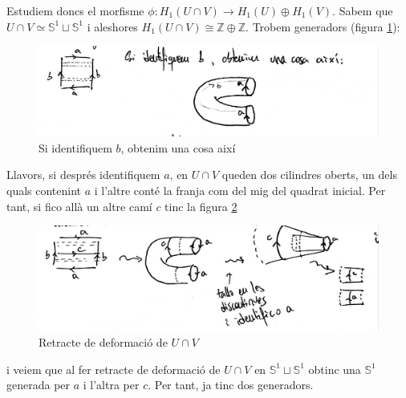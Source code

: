 \documentclass[../main.tex]{subfiles}
\begin{document}
\begin{sol}
Estudiem doncs el morfisme $\phi:H_1(U\cap V)\longrightarrow H_1(U)\oplus H_1(V)$. Sabem que $U\cap V\simeq \mathbb{S}^1\sqcup\mathbb{S}^1$ i aleshores $H_1(U\cap V)\cong\mathbb{Z}\oplus \mathbb{Z}$. Trobem generadors (figura \ref{fig:kleinmv1}):
\begin{figure}[H]
    \centering
    \includegraphics[scale = 0.25]{pictures/kleinmv1.jpeg}
    \caption{Si identifiquem $b$, obtenim una cosa així}
    \label{fig:kleinmv1}
\end{figure}
Llavors, si després identifiquem $a$, en $U\cap V$ queden dos cilindres oberts, un dels quals contenint $a$ i l'altre conté la franja com del mig del quadrat inicial. Per tant, si fico allà un altre camí $c$ tinc la figura \ref{fig:kleinmv2}
\begin{figure}[H]
    \centering
    \includegraphics[scale = 0.25]{pictures/kleinmv2.jpeg}
    \caption{Retracte de deformació de $U\cap V$}
    \label{fig:kleinmv2}
\end{figure}
i veiem que al fer retracte de deformació de $U\cap V$ en $\mathbb{S}^1\sqcup\mathbb{S}^1$ obtinc una $\mathbb{S}^1$ generada per $a$ i l'altra per $c$. Per tant, ja tinc dos generadors.


\end{sol}
\end{document}

